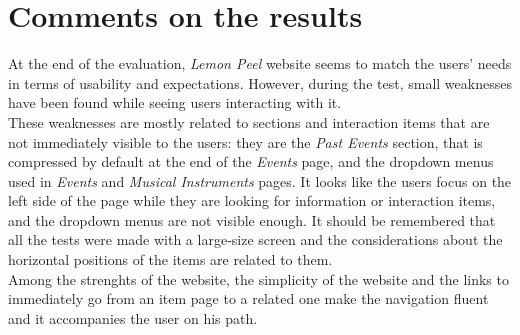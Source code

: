 \documentclass[../../UsabilityReport.tex]{subfiles}
\begin{document}
\section{Comments on the results}
	At the end of the evaluation, \textit{Lemon Peel} website seems to match the users' needs in terms of usability and expectations. However, during the test, small weaknesses have been found while seeing users interacting with it.\\
	These weaknesses are mostly related to sections and interaction items that are not immediately visible to the users: they are the \textit{Past Events} section, that is compressed by default at the end of the \textit{Events} page, and the dropdown menus used in \textit{Events} and \textit{Musical Instruments} pages. It looks like the users focus on the left side of the page while they are looking for information or interaction items, and the dropdown menus are not visible enough. It should be remembered that all the tests were made with a large-size screen and the considerations about the horizontal positions of the items are related to them.\\
	Among the strenghts of the website, the simplicity of the website and the links to immediately go from an item page to a related one make the navigation fluent and it accompanies the user on his path.
\end{document}
